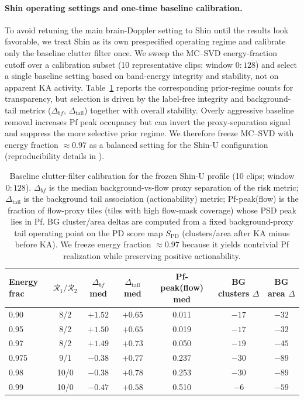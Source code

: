 \paragraph{Shin operating settings and one-time baseline calibration.}
To avoid retuning the main brain-Doppler setting to Shin until the results look favorable, we treat Shin as its own prespecified operating regime and calibrate only the baseline clutter filter once. We sweep the MC--SVD energy-fraction cutoff over a calibration subset (10 representative clips; window $0{:}128$) and select a single baseline setting based on band-energy integrity and stability, not on apparent KA activity. Table~\ref{tab:shin_baseline_sweep} reports the corresponding prior-regime counts for transparency, but selection is driven by the label-free integrity and background-tail metrics ($\Delta_{bf}$, $\Delta_{\mathrm{tail}}$) together with overall stability. Overly aggressive baseline removal increases Pf peak occupancy but can invert the proxy-separation signal and suppress the more selective prior regime. We therefore freeze MC--SVD with energy fraction $\approx 0.97$ as a balanced setting for the Shin-U configuration (reproducibility details in ).

\begin{table}[t]
\centering
\small
\begin{tabular}{lcccccc}
\hline
Energy frac & $\mathcal{R}_1/\mathcal{R}_2$ & $\Delta_{bf}$ med & $\Delta_{\mathrm{tail}}$ med & Pf-peak(flow) med & BG clusters $\Delta$ & BG area $\Delta$ \\
\hline
0.90 & 8/2 & $+1.52$ & $+0.65$ & 0.011 & $-17$ & $-32$ \\
0.95 & 8/2 & $+1.50$ & $+0.65$ & 0.019 & $-17$ & $-32$ \\
0.97 & 8/2 & $+1.49$ & $+0.73$ & 0.050 & $-19$ & $-45$ \\
0.975 & 9/1 & $-0.38$ & $+0.77$ & 0.237 & $-30$ & $-89$ \\
0.98 & 10/0 & $-0.38$ & $+0.78$ & 0.253 & $-30$ & $-89$ \\
0.99 & 10/0 & $-0.47$ & $+0.58$ & 0.510 & $-6$ & $-59$ \\
\hline
\end{tabular}
\caption{Baseline clutter-filter calibration for the frozen Shin-U profile (10 clips; window $0{:}128$). $\Delta_{bf}$ is the median background-vs-flow proxy separation of the risk metric; $\Delta_{\mathrm{tail}}$ is the background tail association (actionability) metric; Pf-peak(flow) is the fraction of flow-proxy tiles (tiles with high flow-mask coverage) whose PSD peak lies in Pf. BG cluster/area deltas are computed from a fixed background-proxy tail operating point on the PD score map $S_{\mathrm{PD}}$ (clusters/area after KA minus before KA). We freeze energy fraction $\approx 0.97$ because it yields nontrivial Pf realization while preserving positive actionability.}
\label{tab:shin_baseline_sweep}
\end{table}

